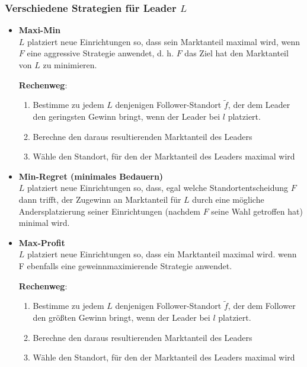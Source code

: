 
      \subsubsection{Verschiedene Strategien für Leader $L$} %
      \label{ssub:verschiedene_strategien_für_leader_}
      
        \begin{itemize}
          \item \textbf{Maxi-Min} \\
          $L$ platziert neue Einrichtungen so, dass sein Marktanteil maximal wird, wenn $F$ eine aggressive Strategie anwendet, d. h. $F$ das Ziel hat den Marktanteil von $L$ zu minimieren.

          \begin{framed}
            \textbf{Rechenweg}:
            \begin{enumerate}
              \item Bestimme zu jedem $L$ denjenigen Follower-Standort $\tilde{f}$, der dem Leader den geringsten Gewinn bringt, wenn der Leader bei $l$ platziert.
              \item Berechne den daraus resultierenden Marktanteil des Leaders
              \item Wähle den Standort, für den der Marktanteil des Leaders maximal wird
            \end{enumerate}
          \end{framed}
          
          \item \textbf{Min-Regret (minimales Bedauern)}\\
          $L$ platziert neue Einrichtungen so, dass, egal welche Standortentscheidung $F$ dann trifft, der Zugewinn an Marktanteil für $L$ durch eine mögliche Andersplatzierung seiner Einrichtungen (nachdem $F$ seine Wahl getroffen hat) minimal wird.

          \item \textbf{Max-Profit}\\
          $L$ platziert neue Einrichtungen so, dass ein Marktanteil maximal wird. wenn F ebenfalls eine geweinnmaximierende Strategie anwendet.

          \begin{framed}
            \textbf{Rechenweg}:
            \begin{enumerate}
              \item Bestimme zu jedem $L$ denjenigen Follower-Standort $\tilde{f}$, der dem Follower den größten Gewinn bringt, wenn der Leader bei $l$ platziert.
              \item Berechne den daraus resultierenden Marktanteil des Leaders
              \item Wähle den Standort, für den der Marktanteil des Leaders maximal wird
            \end{enumerate}
          \end{framed}

        \end{itemize}

